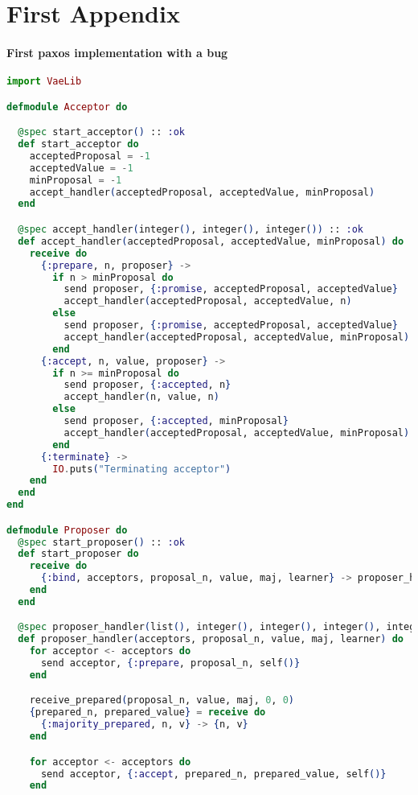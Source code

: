 \appendix
\chapter{First Appendix}

\subsubsection{First paxos implementation with a bug}
\begin{lstlisting}[language=Elixir, xleftmargin=.1\linewidth]
import VaeLib

defmodule Acceptor do

  @spec start_acceptor() :: :ok
  def start_acceptor do
    acceptedProposal = -1
    acceptedValue = -1
    minProposal = -1
    accept_handler(acceptedProposal, acceptedValue, minProposal)
  end

  @spec accept_handler(integer(), integer(), integer()) :: :ok
  def accept_handler(acceptedProposal, acceptedValue, minProposal) do
    receive do
      {:prepare, n, proposer} ->
        if n > minProposal do
          send proposer, {:promise, acceptedProposal, acceptedValue}
          accept_handler(acceptedProposal, acceptedValue, n)
        else
          send proposer, {:promise, acceptedProposal, acceptedValue}
          accept_handler(acceptedProposal, acceptedValue, minProposal)
        end
      {:accept, n, value, proposer} ->
        if n >= minProposal do
          send proposer, {:accepted, n}
          accept_handler(n, value, n)
        else
          send proposer, {:accepted, minProposal}
          accept_handler(acceptedProposal, acceptedValue, minProposal)
        end
      {:terminate} ->
        IO.puts("Terminating acceptor")
    end
  end
end

defmodule Proposer do
  @spec start_proposer() :: :ok
  def start_proposer do
    receive do
      {:bind, acceptors, proposal_n, value, maj, learner} -> proposer_handler(acceptors, proposal_n, value, maj, learner)
    end
  end

  @spec proposer_handler(list(), integer(), integer(), integer(), integer()) :: :ok
  def proposer_handler(acceptors, proposal_n, value, maj, learner) do
    for acceptor <- acceptors do
      send acceptor, {:prepare, proposal_n, self()}
    end

    receive_prepared(proposal_n, value, maj, 0, 0)
    {prepared_n, prepared_value} = receive do
      {:majority_prepared, n, v} -> {n, v}
    end

    for acceptor <- acceptors do
      send acceptor, {:accept, prepared_n, prepared_value, self()}
    end


\end{lstlisting}
